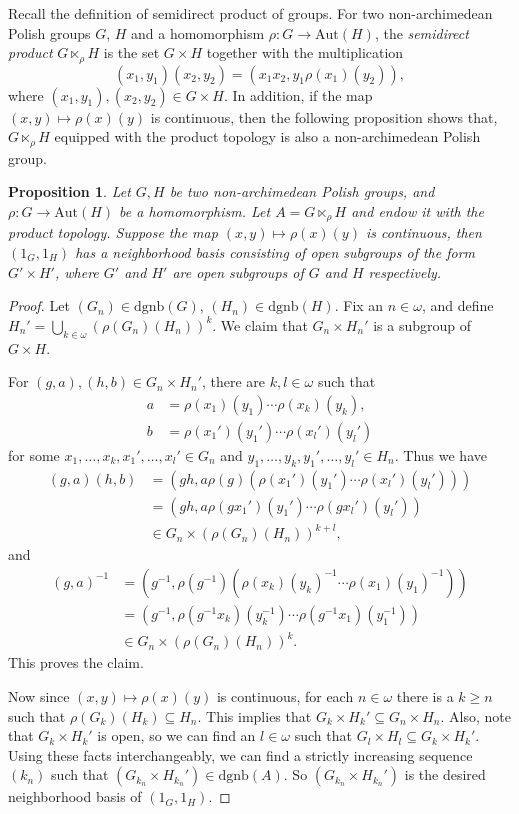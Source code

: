 \documentclass[11pt]{amsart}
\newtheorem{proposition}[theorem]{Proposition}
\theoremstyle{definition}
\theoremstyle{remark}
\numberwithin{equation}{section}
\def\dgnb{{\mathrm{dgnb}}}
\def\aut{{\mathrm{Aut}}}
\begin{document}
Recall the definition of semidirect product of groups. For two non-archimedean Polish groups $G$, $H$ and a homomorphism $\rho:G\to\aut(H)$, the {\it semidirect product} $G\ltimes_\rho H$ is the set $G\times H$ together with the multiplication
$$(x_1,y_1)(x_2,y_2)=(x_1x_2,y_1\rho(x_1)(y_2)),$$
where $(x_1,y_1),(x_2,y_2)\in G\times H$. In addition, if the map $(x,y)\mapsto\rho(x)(y)$ is continuous, then the following proposition shows that, $G\ltimes_\rho H$ equipped with the product topology is also a non-archimedean Polish group.
\begin{proposition}\label{dgnb form of semidirect product}
    Let $G,H$ be two non-archimedean Polish groups, and $\rho:G\to\mathrm{Aut}(H)$ be a homomorphism. Let $A=G\ltimes_\rho H$ and endow it with the product topology. Suppose the map $(x,y)\mapsto\rho(x)(y)$ is continuous, then $(1_G,1_H)$ has a neighborhood basis consisting of open subgroups of the form $G'\times H'$, where $G'$ and $H'$ are open subgroups of $G$ and $H$ respectively.
\end{proposition}
\begin{proof}
    Let $(G_n)\in\dgnb(G)$, $(H_n)\in\dgnb(H)$. Fix an $n\in\omega$, and define $H_n'=\bigcup_{k\in\omega}(\rho(G_n)(H_n))^k$. We claim that $G_n\times H_n'$ is a subgroup of $G\times H$.

    For $(g,a),(h,b)\in G_n\times H_n'$, there are $k,l\in\omega$ such that
    \begin{align*}
        a&=\rho(x_1)(y_1)\cdots\rho(x_k)(y_k), \\
        b&=\rho(x_1')(y_1')\cdots\rho(x_l')(y_l')
    \end{align*}
    for some $x_1,\dots,x_k,x_1',\dots,x_l'\in G_n$ and $y_1,\dots,y_k,y_1',\dots,y_l'\in H_n$. Thus we have
    \begin{align*}
        (g,a)(h,b)&=(gh,a\rho(g)(\rho(x_1')(y_1')\cdots\rho(x_l')(y_l'))) \\
                  &=(gh,a\rho(gx_1')(y_1')\cdots\rho(gx_l')(y_l')) \\
                  &\in G_n\times(\rho(G_n)(H_n))^{k+l},
    \end{align*}
    and
    \begin{align*}
        (g,a)^{-1}&=(g^{-1},\rho(g^{-1})(\rho(x_k)(y_k)^{-1}\cdots\rho(x_1)(y_1)^{-1})) \\
                  &=(g^{-1},\rho(g^{-1}x_k)(y_k^{-1})\cdots\rho(g^{-1}x_1)(y_1^{-1})) \\
                  &\in G_n\times(\rho(G_n)(H_n))^k.
    \end{align*}
    This proves the claim.

Now since $(x,y)\mapsto\rho(x)(y)$ is continuous, for each $n\in\omega$ there is a $k\ge n$ such that $\rho(G_k)(H_k)\subseteq H_n$. This implies that $G_k\times H_k'\subseteq G_n\times H_n$. Also, note that $G_k\times H_k'$ is open, so we can find an $l\in\omega$ such that $G_l\times H_l\subseteq G_k\times H_k'$.
Using these facts interchangeably, we can find a strictly increasing sequence $(k_n)$ such that $(G_{k_n}\times H_{k_n}')\in\mathrm{dgnb}(A)$.
So $(G_{k_n}\times H_{k_n}')$ is the desired neighborhood basis of $(1_G,1_H)$.
\end{proof}
\end{document}
